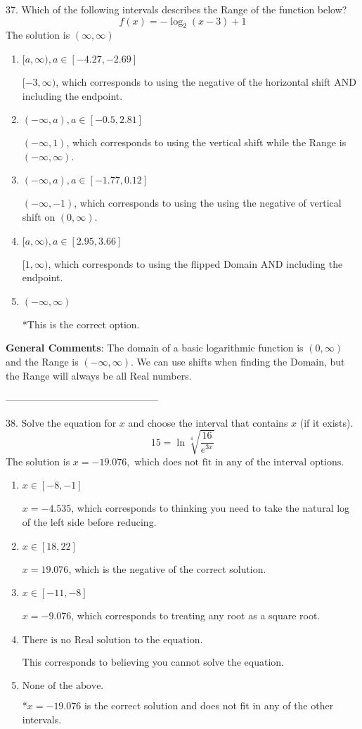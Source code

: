 \documentclass{extbook}[14pt]
\begin{document}
37. Which of the following intervals describes the Range of the function below?
\[ f(x) = -\log_2{(x-3)}+1 \] 
The solution is $ (\infty, \infty) $ 

\begin{enumerate}[label=\Alph*.] 
\item $ [a, \infty), a \in [-4.27, -2.69] $ 

 $[-3, \infty)$, which corresponds to using the negative of the horizontal shift AND including the endpoint. 
\item $ (-\infty, a), a \in [-0.5, 2.81] $ 

 $(-\infty, 1)$, which corresponds to using the vertical shift while the Range is $(-\infty, \infty)$. 
\item $ (-\infty, a), a \in [-1.77, 0.12] $ 

 $(-\infty, -1)$, which corresponds to using the using the negative of vertical shift on $(0, \infty)$. 
\item $ [a, \infty), a \in [2.95, 3.66] $ 

 $[1, \infty)$, which corresponds to using the flipped Domain AND including the endpoint. 
\item $ (-\infty, \infty) $ 

 *This is the correct option. 
\end{enumerate} 
 
\textbf{General Comments}: The domain of a basic logarithmic function is $(0, \infty)$ and the Range is $(-\infty, \infty)$. We can use shifts when finding the Domain, but the Range will always be all Real numbers.

-----------------------------------------------

38.  Solve the equation for $x$ and choose the interval that contains $x$ (if it exists).
\[  15 = \ln{\sqrt[4]{\frac{16}{e^{3x}}}} \] 
The solution is $ x = -19.076, \text{ which does not fit in any of the interval options.} $ 

\begin{enumerate}[label=\Alph*.] 
\item $ x \in [-8, -1] $ 

 $x = -4.535$, which corresponds to thinking you need to take the natural log of the left side before reducing. 
\item $ x \in [18, 22] $ 

 $x = 19.076$, which is the negative of the correct solution. 
\item $ x \in [-11, -8] $ 

 $x = -9.076$, which corresponds to treating any root as a square root. 
\item $ \text{There is no Real solution to the equation.} $ 

 This corresponds to believing you cannot solve the equation. 
\item $ \text{None of the above.} $ 

 *$x = -19.076$ is the correct solution and does not fit in any of the other intervals. 
\end{enumerate} 
 
\end{document}
